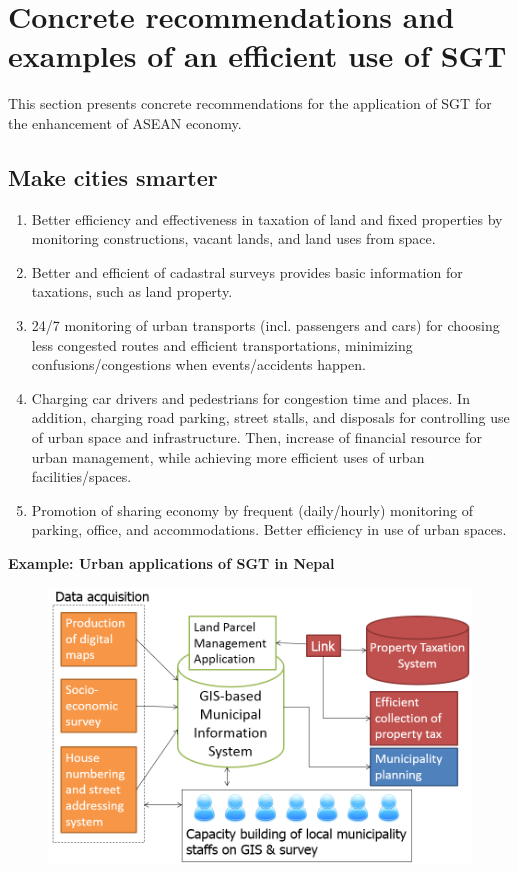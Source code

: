 \section{Concrete recommendations and examples of an efficient use of SGT}

\tab This section presents concrete recommendations for the application of SGT for the enhancement of ASEAN economy.

\subsection{Make cities smarter}

\begin{enumerate}

\item Better efficiency and effectiveness in taxation of land and fixed properties by monitoring constructions, vacant lands, and land uses from space.

\item Better and efficient of cadastral surveys provides basic information for taxations, such as land property.

\item 24/7 monitoring of urban transports (incl. passengers and cars) for choosing less congested routes and efficient transportations, minimizing confusions/congestions when events/accidents happen.

\item Charging car drivers and pedestrians for congestion time and places. In addition, charging road parking, street stalls, and disposals for controlling use of urban space and infrastructure. Then, increase of financial resource for urban management, while achieving more efficient uses of urban facilities/spaces.

\item Promotion of sharing economy by frequent (daily/hourly) monitoring of parking, office, and accommodations. Better efficiency in use of urban spaces.

\end{enumerate}

{\flushleft \bfseries Example: Urban applications of SGT in Nepal}

\begin{figure}[H]
\begin{center}
\includegraphics[width = 0.8\linewidth]{Figures/urban_nepal.png}
\end{center}
\label{urban_nepal}
\end{figure}


